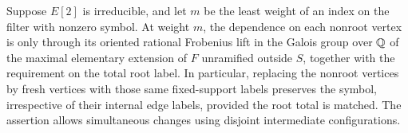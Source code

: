 \begin{lemma}
\label{tc:minimum-transfer}
Suppose $E[2]$ is irreducible, and let $m$ be the least weight
of an index on the filter with nonzero symbol.  At weight $m$,
the dependence on each nonroot vertex is only through its
oriented rational Frobenius lift in the Galois group over $\mathbb Q$
of the maximal elementary extension of $F$ unramified outside $S$, together with the
requirement on the total root label.  In particular, replacing
the nonroot vertices by fresh vertices with those same
fixed-support labels preserves the symbol, irrespective of
their internal edge labels, provided the root total is matched.
The assertion allows simultaneous changes using disjoint
intermediate configurations.
\end{lemma}

